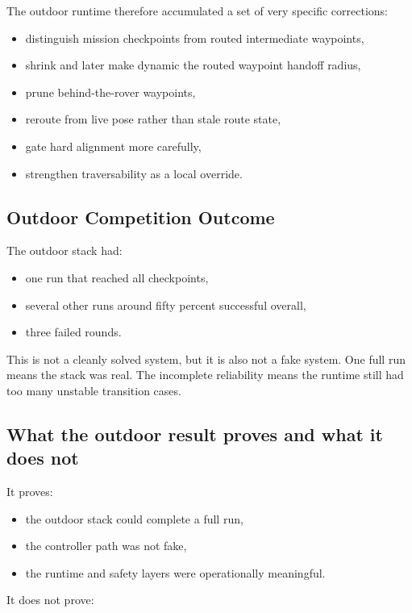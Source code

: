 \documentclass[11pt]{article}
\begin{document}
The outdoor runtime therefore accumulated a set of very specific corrections:

\begin{itemize}[nosep]
  \item distinguish mission checkpoints from routed intermediate waypoints,
  \item shrink and later make dynamic the routed waypoint handoff radius,
  \item prune behind-the-rover waypoints,
  \item reroute from live pose rather than stale route state,
  \item gate hard alignment more carefully,
  \item strengthen traversability as a local override.
\end{itemize}

\subsection{Outdoor Competition Outcome}

The outdoor stack had:

\begin{itemize}[nosep]
  \item one run that reached all checkpoints,
  \item several other runs around fifty percent successful overall,
  \item three failed rounds.
\end{itemize}

This is not a cleanly solved system, but it is also not a fake system. One full run
means the stack was real. The incomplete reliability means the runtime still had
too many unstable transition cases.

\subsection{What the outdoor result proves and what it does not}

It proves:

\begin{itemize}[nosep]
  \item the outdoor stack could complete a full run,
  \item the controller path was not fake,
  \item the runtime and safety layers were operationally meaningful.
\end{itemize}

It does not prove:
\end{document}
